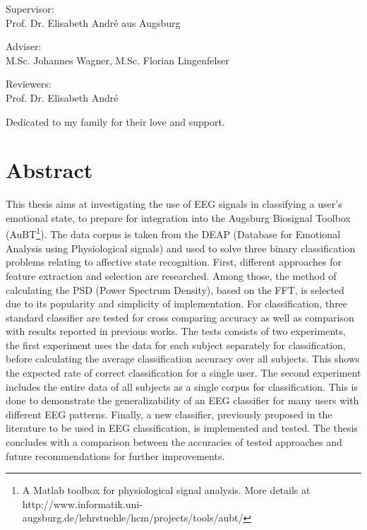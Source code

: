 \documentclass[12pt, a4paper, fleqn]{memoir}%
\begin{document}
\vspace{2.0em}
\begin{center}
    \normalsize
    Supervisor:\\ 
    Prof. Dr. Elisabeth Andr\'{e} aus Augsburg
\end{center}
\begin{center}
    \normalsize
    Adviser:\\
    M.Sc. Johannes Wagner,
    M.Sc. Florian Lingenfelser 
\end{center}
\begin{center}
    \normalsize
    Reviewers:\\
    Prof. Dr. Elisabeth Andr\'{e}\\
\end{center}
\cleardoublepage

\vspace*{\fill}
{\hfill\sffamily\itshape} Dedicated to my family for their love and support. 
\cleardoublepage

\chapter*{Abstract}
This thesis aims at investigating the use of EEG signals in classifying a user's emotional state, to prepare for integration into the Augsburg Biosignal Toolbox (AuBT\footnote{A Matlab toolbox for physiological signal analysis. More details at http://www.informatik.uni-augsburg.de/lehrstuehle/hcm/projects/tools/aubt/}). The data corpus is taken from the DEAP (Database for Emotional Analysis using Physiological signals) and used to solve three binary classification problems relating to affective state recognition. First, different approaches for feature extraction and selection are researched. Among those, the method of calculating the PSD (Power Spectrum Density), based on the FFT,  is selected due to its popularity and simplicity of implementation. For classification, three standard classifier are tested for cross comparing accuracy as well as comparison with results reported in previous works. The tests consists of two experiments, the first experiment uses the data for each subject separately for classification, before calculating the average classification accuracy over all subjects. This shows the expected rate of correct classification for a single user. The second experiment includes the entire data of all subjects as a single corpus for classification. This is done to demonstrate the generalizability of an EEG classifier for many users with different EEG patterns. Finally, a new classifier, previously proposed in the literature to be used in EEG classification, is implemented and tested. The thesis concludes with a comparison between the accuracies of tested approaches and future recommendations for further improvements. 
\end{document}
